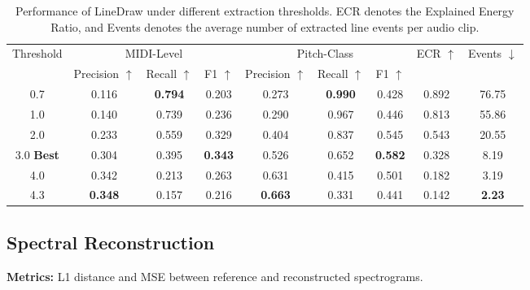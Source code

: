 \documentclass[11pt]{article}
\begin{document}
\begin{table}[htbp]
\centering
\caption{Performance of LineDraw under different extraction thresholds. ECR denotes the Explained Energy Ratio, and Events denotes the average number of extracted line events per audio clip.}
\label{tab:linedraw_threshold}

\begin{tabular}{c|ccc|ccc|cc}
\toprule
\multirow{2}{*}{Threshold}
&
\multicolumn{3}{c|}{MIDI-Level}
&
\multicolumn{3}{c|}{Pitch-Class}
&
\multirow{2}{*}{ECR $\uparrow$}
&
\multirow{2}{*}{Events $\downarrow$}
\\

&
Precision $\uparrow$
&
Recall $\uparrow$
&
F1 $\uparrow$
&
Precision $\uparrow$
&
Recall $\uparrow$
&
F1 $\uparrow$
&
&
\\
\midrule

0.7 & 0.116 & \textbf{0.794} & 0.203 & 0.273 & \textbf{0.990} & 0.428 & 0.892 & 76.75 \\

1.0 & 0.140 & 0.739 & 0.236 & 0.290 & 0.967 & 0.446 & 0.813 & 55.86 \\

2.0 & 0.233 & 0.559 & 0.329 & 0.404 & 0.837 & 0.545 & 0.543 & 20.55 \\

3.0 \textbf{Best} & 0.304 & 0.395 & \textbf{0.343} & 0.526 & 0.652 & \textbf{0.582} & 0.328 & 8.19 \\

4.0 & 0.342 & 0.213 & 0.263 & 0.631 & 0.415 & 0.501 & 0.182 & 3.19 \\

4.3 & \textbf{0.348} & 0.157 & 0.216 & \textbf{0.663} & 0.331 & 0.441 & 0.142 & \textbf{2.23} \\

\bottomrule
\end{tabular}

\end{table}



\subsection{Spectral Reconstruction}
\textbf{Metrics:} L1 distance and MSE between reference and reconstructed spectrograms.
\end{document}
